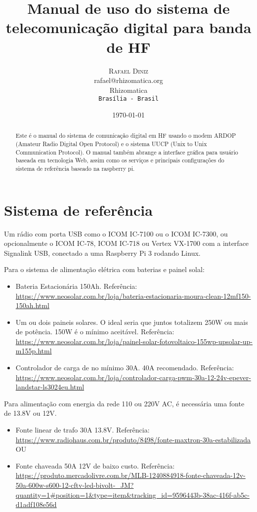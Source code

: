 \documentclass[11pt,a4paper]{article}
\title{Manual de uso do sistema de telecomunicação digital para banda de HF}
\author{
       \large
        \textsc{Rafael Diniz}
        \mbox{}\\ %
        rafael@rhizomatica.org\\
        \mbox{Rhizomatica} \\ %
        \normalsize
        \texttt{Brasília - Brasil}\\
}
\date{\today}
\begin{document}
\maketitle

\begin{abstract}
Este é o manual do sistema de comunicação digital em HF usando o modem ARDOP
(Amateur Radio Digital Open Protocol) e o sistema UUCP (Unix to Unix
Communication Protocol). O manual também abrange a interface gráfica
para usuário baseada em tecnologia Web, assim como os serviços e principais
configurações do sistema de referência baseado na raspberry pi.

\end{abstract}

\newpage

\tableofcontents

\section{Sistema de referência}

Um rádio com porta USB como o ICOM IC-7100 ou o ICOM IC-7300, ou opcionalmente o ICOM IC-78, ICOM IC-718 ou Vertex
VX-1700 com a interface Signalink USB, conectado a uma Raspberry Pi 3
rodando Linux.

Para o sistema de alimentação elétrica com baterias e painel solal:
\begin{itemize}
\item Bateria Estacionária 150Ah. Referência: \url{https://www.neosolar.com.br/loja/bateria-estacionaria-moura-clean-12mf150-150ah.html}
\item Um ou dois paineis solares. O ideal seria que juntos totalizem 250W ou mais de potência. 150W é o mínimo aceitável. Referência: \url{https://www.neosolar.com.br/loja/painel-solar-fotovoltaico-155wp-upsolar-up-m155p.html}
\item Controlador de carga de no mínimo 30A. 40A recomendado. Referência: \url{https://www.neosolar.com.br/loja/controlador-carga-pwm-30a-12-24v-epever-landstar-ls3024eu.html}
\end{itemize}

Para alimentação com energia da rede 110 ou 220V AC, é necessária uma fonte de 13.8V ou 12V.
\begin{itemize}
\item Fonte linear de trafo 30A 13.8V. Referência: \url{https://www.radiohaus.com.br/produto/8498/fonte-maxtron-30a-estabilizada} OU
\item Fonte chaveada 50A 12V de baixo custo. Referência:
  \url{https://produto.mercadolivre.com.br/MLB-1240884918-fonte-chaveada-12v-50a-600w-s600-12-cftv-led-bivolt-_JM?quantity=1#position=1&type=item&tracking_id=9596443b-38ac-416f-ab5c-d1adf108e56d}
\end{itemize}
\end{document}

